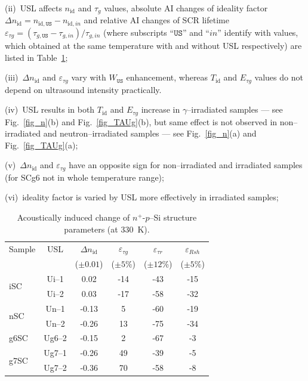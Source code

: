 \documentclass[aip,jap, amsmath,amssymb,reprint]{revtex4-1}
\begin{document}
\noindent
(ii)~USL affects $n_{\mathrm{id}}$ and $\tau_g$ values, absolute AI changes of ideality factor $\Delta n_{\mathrm{id}}=n_{\mathrm{id},\mathtt{US}}-n_{\mathrm{id},in}$ and
relative AI changes of SCR lifetime $\varepsilon_{\tau g}=(\tau_{g,\mathtt{US}}-\tau_{g,in})/\tau_{g,in}$
(where subscripts ``$\mathtt{US}$'' and ``$in$'' identify with values,
which obtained at the same temperature with and without USL respectively)
are listed in Table~\ref{tabAIchange};

\noindent
(iii)~$\Delta n_{\mathrm{id}}$ and $\varepsilon_{\tau g}$ vary with $W_{\mathtt{US}}$ enhancement, whereas $T_{\mathrm{id}}$ and $E_{\tau g}$ values do not depend on ultrasound intensity practically.


\noindent
(iv)~USL results in both $T_{\mathrm{id}}$ and $E_{\tau g}$ increase in $\gamma$--irradiated samples --- see Fig.~\ref{fig_n}(b) and Fig.~\ref{fig_TAUg}(b), but same effect is not observed in non--irradiated and neutron--irradiated samples --- see Fig.~\ref{fig_n}(a) and Fig.~\ref{fig_TAUg}(a);

\noindent
(v)~$\Delta n_{\mathrm{id}}$ and $\varepsilon_{\tau g}$ have an opposite sign for non--irradiated and irradiated samples
(for SCg6 not in whole temperature range);

\noindent
(vi)~ideality factor is varied by USL more effectively in irradiated samples;






\begin{table}
\caption{\label{tabAIchange}Acoustically induced change of $n^+$-$p$--Si structure parameters (at 330~K).
}
\begin{ruledtabular}
\begin{tabular}{lccccc}
Sample&USL&$\Delta n_{\mathrm{id}}$ &$\varepsilon_{\tau g}$ &$\varepsilon_{\tau r}$ &$\varepsilon_{Rsh}$ \\
&&\mbox{($\pm0.01$)}&($\pm5$\%)&($\pm12$\%)&($\pm5$\%)\\
\hline
\multirow{2}{*}{iSC}&Ui--1&0.02&-14&-43&-15\\
&Ui--2&0.03&-17&-58&-32\\
\multirow{2}{*}{nSC}&Un--1&-0.13&5&-60&-19\\
&Un--2&-0.26&13&-75&-34\\
g6SC&Ug6--2&-0.15&2&-67&-3\\
\multirow{2}{*}{g7SC}&Ug7--1&-0.26&49&-39&-5\\
&Ug7--2&-0.36&70&-58&-8\\
\end{tabular}
\end{ruledtabular}
\end{table}
\end{document}
